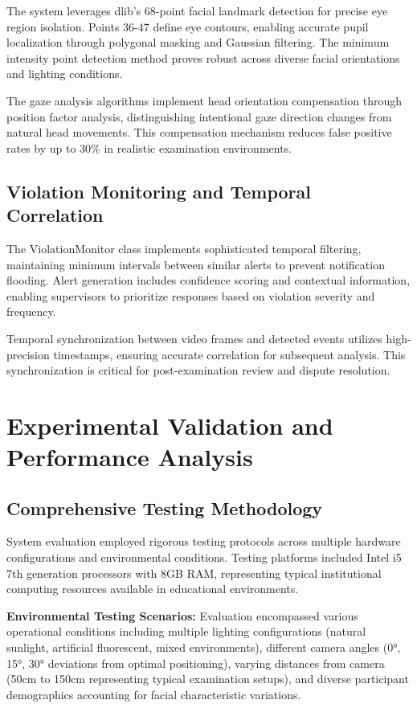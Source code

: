 \documentclass[conference]{IEEEtran}
\begin{document}
The system leverages dlib's 68-point facial landmark detection for precise eye region isolation\cite{el2023drowsiness}. Points 36-47 define eye contours, enabling accurate pupil localization through polygonal masking and Gaussian filtering. The minimum intensity point detection method proves robust across diverse facial orientations and lighting conditions.

The gaze analysis algorithms implement head orientation compensation through position factor analysis, distinguishing intentional gaze direction changes from natural head movements. This compensation mechanism reduces false positive rates by up to 30\% in realistic examination environments.

\subsection{Violation Monitoring and Temporal Correlation}

The ViolationMonitor class implements sophisticated temporal filtering, maintaining minimum intervals between similar alerts to prevent notification flooding\cite{pythondatetime}. Alert generation includes confidence scoring and contextual information, enabling supervisors to prioritize responses based on violation severity and frequency.

Temporal synchronization between video frames and detected events utilizes high-precision timestamps, ensuring accurate correlation for subsequent analysis. This synchronization is critical for post-examination review and dispute resolution\cite{pythonlogging}.

\section{Experimental Validation and Performance Analysis}

\subsection{Comprehensive Testing Methodology}

System evaluation employed rigorous testing protocols across multiple hardware configurations and environmental conditions. Testing platforms included Intel i5 7th generation processors with 8GB RAM, representing typical institutional computing resources available in educational environments.

\textbf{Environmental Testing Scenarios:} Evaluation encompassed various operational conditions including multiple lighting configurations (natural sunlight, artificial fluorescent, mixed environments), different camera angles (0°, 15°, 30° deviations from optimal positioning), varying distances from camera (50cm to 150cm representing typical examination setups), and diverse participant demographics accounting for facial characteristic variations.
\end{document}
